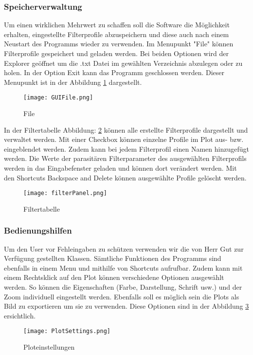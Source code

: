 \subsubsection{Speicherverwaltung}  \label{subsubsec:speicherverwaltung}
Um einen wirklichen Mehrwert zu schaffen soll die Software die Möglichkeit erhalten, eingestellte Filterprofile abzuspeichern und diese auch nach einem Neustart des Programms wieder zu verwenden. Im Menupunkt "File" können Filterprofile gespeichert und geladen werden. Bei beiden Optionen wird der Explorer geöffnet um die .txt Datei im gewählten Verzeichnis abzulegen oder zu holen. In der Option Exit kann das Programm geschlossen werden. Dieser Menupunkt ist in der Abbildung \ref{fig:GUIFile}  dargestellt.
\begin{figure}[H]
	\centering
	\texttt{[image: GUIFile.png]}
	\caption{File}
	\label{fig:GUIFile}
\end{figure}
In der Filtertabelle Abbildung: \ref{fig:filterPanel} können alle erstellte Filterprofile dargestellt und verwaltet werden.  Mit einer Checkbox können einzelne Profile im Plot aus- bzw. eingeblendet werden. Zudem kann bei jedem Filterprofil einen Namen hinzugefügt werden. Die Werte der parasitären Filterparameter des ausgewählten Filterprofils werden in das Eingabefenster geladen und können dort verändert werden. Mit den Shortcuts Backspace and Delete können ausgewählte Profile gelöscht werden.
\begin{figure}[H]
	\centering
	\texttt{[image: filterPanel.png]}
	\caption{Filtertabelle}
	\label{fig:filterPanel}
\end{figure}
\bigskip

\subsubsection{Bedienungshilfen}\label{subsubsec:bedienungshilfen}
Um den User vor Fehleingaben zu schützen verwenden wir die von Herr Gut zur Verfügung gestellten Klassen.
Sämtliche Funktionen des Programms sind ebenfalls in einem Menu und mithilfe von Shortcuts aufrufbar.
Zudem kann mit einem Rechtsklick auf den Plot können verschiedene Optionen ausgewählt werden. So können die Eigenschaften (Farbe, Darstellung, Schrift usw.) und der Zoom individuell eingestellt werden. Ebenfalls soll es möglich sein die Plots als Bild zu exportieren um sie zu verwenden. Diese Optionen sind in der Abbildung \ref{fig:PlotSettings} ersichtlich.
\begin{figure}[H]
	\centering
	\texttt{[image: PlotSettings.png]}
	\caption{Ploteinstellungen}
	\label{fig:PlotSettings}
\end{figure} 
\bigskip

